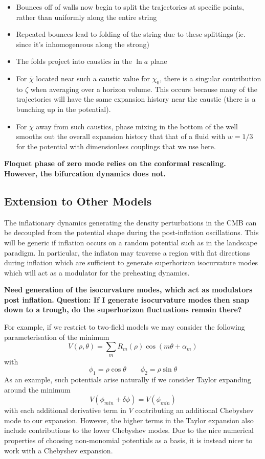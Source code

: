 \documentclass[11pt,a4paper]{article}
\begin{document}
\begin{itemize}
\item Bounces off of walls now begin to split the trajectories at specific points, rather than uniformly along the entire string
\item Repeated bounces lead to folding of the string due to these splittings (ie. since it's inhomogeneous along the strong)
\item The folds project into caustics in the $\ln a$ plane
\item For $\bar{\chi}$ located near such a caustic value for $\chi_0$, there is a singular contribution to $\zeta$ when averaging over a horizon volume.  This occurs because many of the trajectories will have the same expansion history near the caustic (there is a bunching up in the potential).
\item For $\bar{\chi}$ away from such caustics, phase mixing in the bottom of the well smooths out the overall expansion history that that of a fluid with $w=1/3$ for the potential with dimensionless couplings that we use here.
\end{itemize}
{\bf Floquet phase of zero mode relies on the conformal rescaling.  However, the bifurcation dynamics does not.}

\subsection{Extension to Other Models}
The inflationary dynamics generating the density perturbations in the CMB can be decoupled from the potential shape during the post-inflation oscillations.
This will be generic if inflation occurs on a random potential such as in the landscape paradigm.
In particular, the inflaton may traverse a region with flat directions during inflation which are sufficient to generate superhorizon isocurvature modes which will act as a modulator for the preheating dynamics.

{\bf Need generation of the isocurvature modes, which act as modulators post inflation.}
{\bf Question: If I generate isocurvature modes then snap down to a trough, do the superhorizon fluctuations remain there?}

For example, if we restrict to two-field models we may consider the following parameterisation of the minimum
\begin{equation}
  V(\rho,\theta) = \sum_{m} R_m(\rho)\cos(m\theta + \alpha_m)
\end{equation}
with
\begin{equation}
  \phi_1 = \rho\cos\theta \qquad \phi_2 = \rho\sin\theta
\end{equation}
As an example, such potentials arise naturally if we consider Taylor expanding around the minimum
\begin{equation}
  V(\phi_{min}+\delta\phi) = V(\phi_{min})
\end{equation}
with each additional derivative term in $V$ contributing an additional Chebyshev mode to our expansion.
However, the higher terms in the Taylor expansion also include contributions to the lower Chebyshev modes.
Due to the nice numerical properties of choosing non-monomial potentials as a basis, it is instead nicer to work with a Chebyshev expansion.
\end{document}
